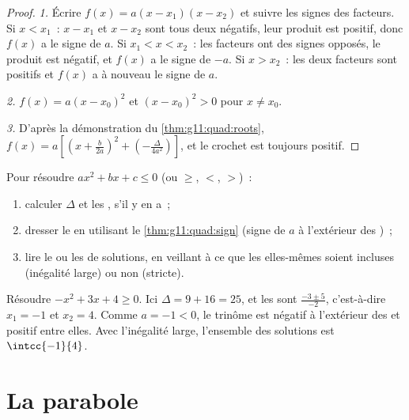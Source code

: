 \begin{proof}
\emph{1.} Écrire $f(x) = a(x-x_1)(x-x_2)$ et suivre les signes des
facteurs. Si $x < x_1$~: $x - x_1$ et $x - x_2$ sont tous deux négatifs,
leur produit est positif, donc $f(x)$ a le signe de $a$. Si
$x_1 < x < x_2$~: les facteurs ont des signes opposés, le produit est
négatif, et $f(x)$ a le signe de $-a$. Si $x > x_2$~: les deux facteurs
sont positifs et $f(x)$ a à nouveau le signe de $a$.

\emph{2.} $f(x) = a(x - x_0)^2$ et $(x-x_0)^2 > 0$ pour $x \neq x_0$.

\emph{3.} D'après la démonstration du \cref{thm:g11:quad:roots},
$f(x) = a\left[\left(x + \frac{b}{2a}\right)^2 +
\left(-\frac{\Delta}{4a^2}\right)\right]$, et le crochet est toujours
positif.
\end{proof}

\begin{method}\label{met:g11:quad:inequalities}
Pour résoudre $ax^2 + bx + c \leq 0$ (ou $\geq$, $<$, $>$)~:
\begin{enumerate}
  \item calculer $\Delta$ et les , s'il y en a~;
  \item dresser le  en utilisant le
        \cref{thm:g11:quad:sign} (signe de $a$ à l'extérieur des
        )~;
  \item lire le ou les  de solutions, en veillant à ce que les
         elles-mêmes soient incluses (inégalité large) ou non
        (stricte).
\end{enumerate}
\end{method}

\begin{example}\label{ex:g11:quad:inequality}
Résoudre $-x^2 + 3x + 4 \geq 0$. Ici $\Delta = 9 + 16 = 25$, et les
 sont $\frac{-3 \pm 5}{-2}$, c'est-à-dire $x_1 = -1$ et
$x_2 = 4$. Comme $a = -1 < 0$, le trinôme est négatif à l'extérieur des
 et positif entre elles. Avec l'inégalité large, l'ensemble des
solutions est $\intcc{-1}{4}$.
\end{example}

\section{La parabole}

